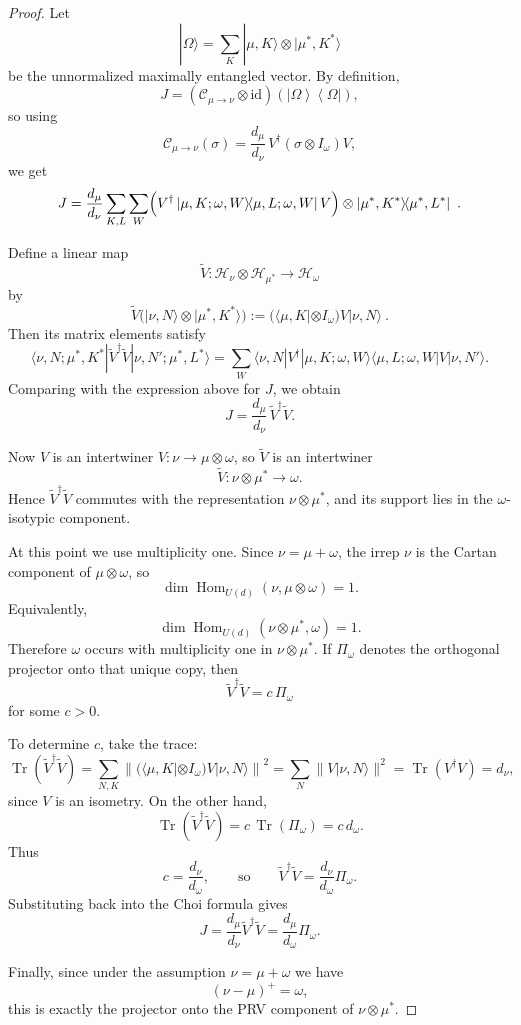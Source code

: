 \documentclass[a4paper,onecolumn,11pt]{quantumarticle}
\newcommand{\ket}[1]{| #1 \rangle}
\newcommand{\bra}[1]{\langle #1 |}
\newcommand{\ketbra}[2]{\left|#1\right\rangle\!\!\left\langle #2\right|}
\begin{document}
\begin{proof}
Let
\[
\ket{\Omega}=\sum_K \ket{\mu,K}\otimes\ket{\mu^*,K^*}
\]
be the unnormalized maximally entangled vector. By definition,
\[
J=(\mathcal C_{\mu\to\nu}\otimes \mathrm{id})(\ketbra{\Omega}{\Omega}),
\]
so using
\[
\mathcal C_{\mu\to\nu}(\sigma)
=\frac{d_\mu}{d_\nu}\,V^\dagger(\sigma\otimes I_\omega)V,
\]
we get
\[
J=\frac{d_\mu}{d_\nu}\sum_{K,L}\sum_W
\Bigl(
V^\dagger \ketbra{\mu,K;\omega,W}{\mu,L;\omega,W} V
\Bigr)
\otimes
\ketbra{\mu^*,K^*}{\mu^*,L^*}\ .
\]

Define a linear map
\[
\tilde V:\mathcal H_\nu\otimes \mathcal H_{\mu^*}\to \mathcal H_\omega
\]
by
\[
\tilde V\bigl(\ket{\nu,N}\otimes\ket{\mu^*,K^*}\bigr)
:=
(\bra{\mu,K}\otimes I_\omega)V\ket{\nu,N}\ .
\]
Then its matrix elements satisfy
\[
\bra{\nu,N;\mu^*,K^*}\tilde V^\dagger \tilde V\ket{\nu,N';\mu^*,L^*}
=
\sum_W
\bra{\nu,N}V^\dagger\ket{\mu,K;\omega,W}
\bra{\mu,L;\omega,W}V\ket{\nu,N'}.
\]
Comparing with the expression above for \(J\), we obtain
\[
J=\frac{d_\mu}{d_\nu}\,\tilde V^\dagger \tilde V.
\]

Now \(V\) is an intertwiner \(V:\nu\to \mu\otimes\omega\), so \(\tilde V\) is an intertwiner
\[
\tilde V:\nu\otimes \mu^* \to \omega.
\]
Hence \(\tilde V^\dagger\tilde V\) commutes with the representation \(\nu\otimes\mu^*\), and its support lies in the \(\omega\)-isotypic component.

At this point we use multiplicity one. Since \(\nu=\mu+\omega\), the irrep \(\nu\) is the Cartan component of \(\mu\otimes\omega\), so
\[
\dim \operatorname{Hom}_{U(d)}(\nu,\mu\otimes\omega)=1.
\]
Equivalently,
\[
\dim \operatorname{Hom}_{U(d)}(\nu\otimes\mu^*,\omega)=1.
\]
Therefore \(\omega\) occurs with multiplicity one in \(\nu\otimes\mu^*\). If \(\Pi_\omega\) denotes the orthogonal projector onto that unique copy, then
\[
\tilde V^\dagger\tilde V = c\,\Pi_\omega
\]
for some \(c>0\).

To determine \(c\), take the trace:
\[
\operatorname{Tr}(\tilde V^\dagger\tilde V)
=
\sum_{N,K}\left\|
(\bra{\mu,K}\otimes I_\omega)V\ket{\nu,N}
\right\|^2
=
\sum_N \|V\ket{\nu,N}\|^2
=
\operatorname{Tr}(V^\dagger V)
=
d_\nu,
\]
since \(V\) is an isometry. On the other hand,
\[
\operatorname{Tr}(\tilde V^\dagger\tilde V)=c\,\operatorname{Tr}(\Pi_\omega)=c\,d_\omega.
\]
Thus
\[
c=\frac{d_\nu}{d_\omega},
\qquad\text{so}\qquad
\tilde V^\dagger\tilde V=\frac{d_\nu}{d_\omega}\Pi_\omega.
\]
Substituting back into the Choi formula gives
\[
J=\frac{d_\mu}{d_\nu}\tilde V^\dagger\tilde V
=\frac{d_\mu}{d_\omega}\Pi_\omega.
\]

Finally, since under the assumption \(\nu=\mu+\omega\) we have
\[
(\nu-\mu)^+=\omega,
\]
this is exactly the projector onto the PRV component of \(\nu\otimes\mu^*\).
\end{proof}
\end{document}
